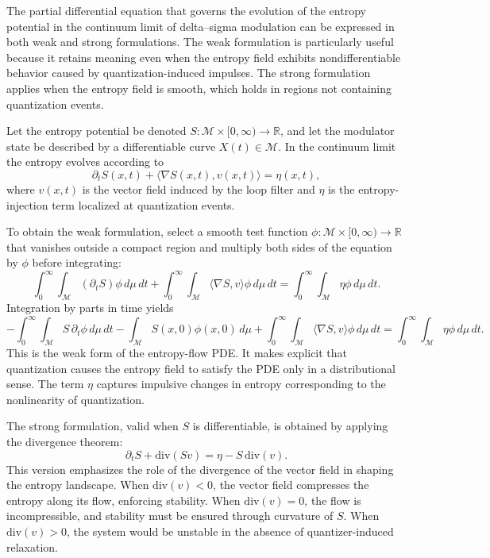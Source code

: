The partial differential equation that governs the evolution of the entropy potential in the continuum limit of delta–sigma modulation can be expressed in both weak and strong formulations. The weak formulation is particularly useful because it retains meaning even when the entropy field exhibits nondifferentiable behavior caused by quantization-induced impulses. The strong formulation applies when the entropy field is smooth, which holds in regions not containing quantization events.

Let the entropy potential be denoted \(S:\mathcal{M}\times[0,\infty)\to \mathbb{R}\), and let the modulator state be described by a differentiable curve \(X(t)\in\mathcal{M}\). In the continuum limit the entropy evolves according to
\[
\partial_t S(x,t) + \langle \nabla S(x,t), v(x,t)\rangle = \eta(x,t),
\]
where \(v(x,t)\) is the vector field induced by the loop filter and \(\eta\) is the entropy-injection term localized at quantization events.

To obtain the weak formulation, select a smooth test function \(\phi:\mathcal{M}\times[0,\infty)\to\mathbb{R}\) that vanishes outside a compact region and multiply both sides of the equation by \(\phi\) before integrating:
\[
\int_0^\infty \int_{\mathcal{M}} \left( \partial_t S \right)\phi \, d\mu \, dt
+
\int_0^\infty \int_{\mathcal{M}} \langle \nabla S, v\rangle \phi \, d\mu \, dt
=
\int_0^\infty \int_{\mathcal{M}} \eta \phi \, d\mu \, dt.
\]
Integration by parts in time yields
\[
-\int_0^\infty \int_{\mathcal{M}} S \, \partial_t \phi \, d\mu \, dt
-
\int_{\mathcal{M}} S(x,0)\phi(x,0)\,d\mu
+
\int_0^\infty \int_{\mathcal{M}} \langle \nabla S, v\rangle \phi \, d\mu \, dt
=
\int_0^\infty \int_{\mathcal{M}} \eta \phi \, d\mu \, dt.
\]
This is the weak form of the entropy-flow PDE. It makes explicit that quantization causes the entropy field to satisfy the PDE only in a distributional sense. The term \(\eta\) captures impulsive changes in entropy corresponding to the nonlinearity of quantization.

The strong formulation, valid when \(S\) is differentiable, is obtained by applying the divergence theorem:
\[
\partial_t S + \mathrm{div}(S v) = \eta - S\,\mathrm{div}(v).
\]
This version emphasizes the role of the divergence of the vector field in shaping the entropy landscape. When \(\mathrm{div}(v)<0\), the vector field compresses the entropy along its flow, enforcing stability. When \(\mathrm{div}(v)=0\), the flow is incompressible, and stability must be ensured through curvature of \(S\). When \(\mathrm{div}(v)>0\), the system would be unstable in the absence of quantizer-induced relaxation.

